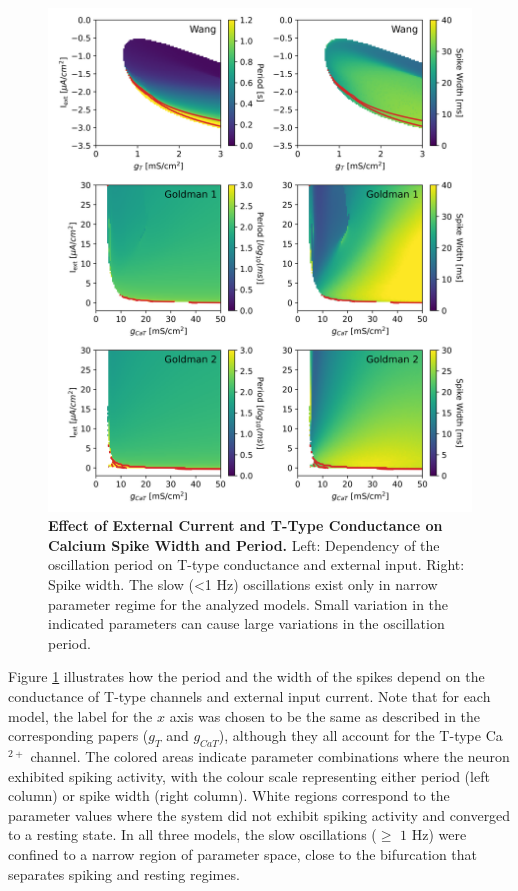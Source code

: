 \documentclass[../main.tex]{subfiles}
\begin{document}
\begin{figure}[!t]
    \centering
    \includegraphics[width=0.9\linewidth]{../img/ttx_block/ttx_block.png}
    \caption[Effect of External Current and T-Type Conductance on Calcium Spike Width and Period]{
        \textbf{Effect of External Current and T-Type Conductance on Calcium Spike Width and Period.} Left: Dependency of the oscillation period on T-type conductance and external input. Right: Spike width. The slow (<1 Hz) oscillations exist only in narrow parameter regime for the analyzed models. Small variation in the indicated parameters can cause large variations in the oscillation period.
    }
    \label{fig:models_ttx_block}
\end{figure}

Figure \ref{fig:models_ttx_block} illustrates how the period and the width of the spikes depend on the conductance of T-type channels and external input current. Note that for each model, the label for the $x$ axis was chosen to be the same as described in the corresponding papers ($g_T$ and $g_{CaT}$), although they all account for the T-type Ca$^{2+}$ channel. The colored areas indicate parameter combinations where the neuron exhibited spiking activity, with the colour scale representing either period (left column) or spike width (right column). White regions correspond to the parameter values where the system did not exhibit spiking activity and converged to a resting state. In all three models, the slow oscillations ($\geq$ $1$ Hz) were confined to a narrow region of parameter space, close to the bifurcation that separates spiking and resting regimes.
\end{document}
